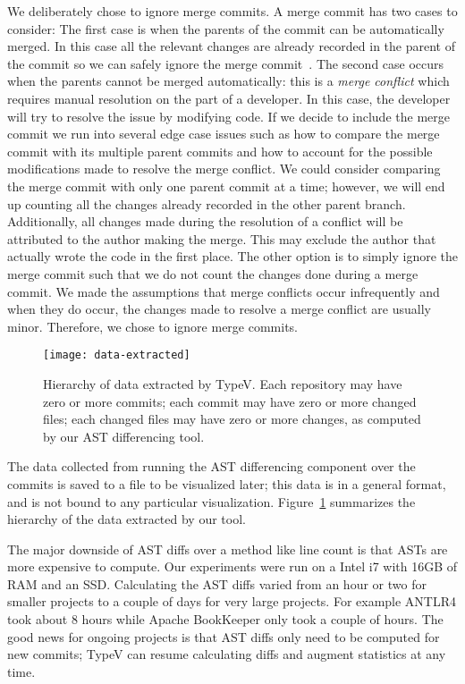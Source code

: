 We deliberately chose to ignore merge commits. A merge commit has two cases to consider: The first case is when the parents of the commit can be automatically merged. In this case all the relevant changes are already recorded in the parent of the commit so we can safely ignore the merge commit~\cite{git:merge}. The second case occurs when the parents cannot be merged automatically: this is a \emph{merge conflict} which requires manual resolution on the part of a developer. In this case, the developer will try to resolve the issue by modifying code. If we decide to include the merge commit we run into several edge case issues such as how to compare the merge commit with its multiple parent commits and how to account for the possible modifications made to resolve the merge conflict. We could consider comparing the merge commit with only one parent commit at a time; however, we will end up counting all the changes already recorded in the other parent branch. Additionally, all changes made during the resolution of a conflict will be attributed to the author making the merge. This may exclude the author that actually wrote the code in the first place. The other option is to simply ignore the merge commit such that we do not count the changes done during a merge commit. We made the assumptions that merge conflicts occur infrequently and when they do occur, the changes made to resolve a merge conflict are usually minor. Therefore, we chose to ignore merge commits. 

\begin{figure}[tb]
\centering
\texttt{[image: data-extracted]}
\caption{Hierarchy of data extracted by TypeV. Each repository may have zero or more commits; each commit may have zero or more changed files; each changed files may have zero or more changes, as computed by our AST differencing tool.}
\label{fig:data-extracted}
\end{figure}

The data collected from running the AST differencing component over the commits is saved to a file to be visualized later; this data is in a general format, and is not bound to any particular visualization. Figure~\ref{fig:data-extracted} summarizes the hierarchy of the data extracted by our tool.

The major downside of AST diffs over a method like line count is that ASTs are more expensive to compute. Our experiments were run on a Intel i7 with 16GB of RAM and an SSD. Calculating the AST diffs varied from an hour or two for smaller projects to a couple of days for very large projects. For example ANTLR4 took about 8 hours while Apache BookKeeper only took a couple of hours. The good news for ongoing projects is that AST diffs only need to be computed for new commits; TypeV can resume calculating diffs and augment statistics at any time.

